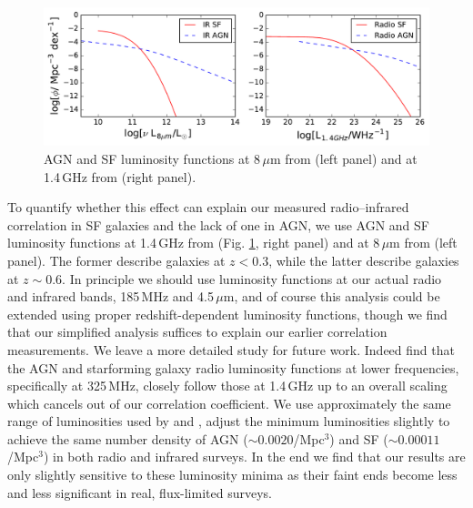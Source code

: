\documentclass{emulateapj}
\begin{document}
\begin{figure}[h]
\centering
\includegraphics[width=6in]{images/sim_rad_ir_luminosity_functions.pdf}
\caption{AGN and SF luminosity functions at 8\,$\mu$m from \citet{fu10} (left panel) and at 1.4\,GHz from \citet{mauch07} (right panel).}
\label{fig:luminosityfunctions}
\end{figure}

To quantify whether this effect can explain our measured radio--infrared correlation in SF galaxies and the lack of one in AGN, we use AGN and SF luminosity functions at 1.4\,GHz from \citet{mauch07} (Fig. \ref{fig:luminosityfunctions}, right panel) and at 8\,$\mu$m from \citet{fu10} (left panel). The former describe galaxies at $z<0.3$, while the latter describe galaxies at $z\sim0.6$. In principle we should use luminosity functions at our actual radio and infrared bands, 185\,MHz and 4.5\,$\mu$m, and of course this analysis could be extended using proper redshift-dependent luminosity functions, though we find that our simplified analysis suffices to explain our earlier correlation measurements. We leave a more detailed study for future work. Indeed \citet{prescott16} find that the AGN and starforming galaxy radio luminosity functions at lower frequencies, specifically at 325\,MHz, closely follow those at 1.4\,GHz up to an overall scaling which cancels out of our correlation coefficient. We use approximately the same range of luminosities used by \citet{mauch07} and \citet{fu10}, adjust the minimum luminosities slightly to achieve the same number density of AGN ($\sim0.0020$/Mpc$^3$) and SF ($\sim0.00011$/Mpc$^3$) in both radio and infrared surveys. In the end we find that our results are only slightly sensitive to these luminosity minima as their faint ends become less and less significant in real, flux-limited surveys. 
\end{document}
